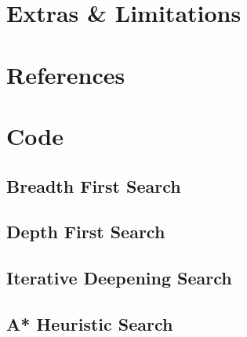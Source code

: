\documentclass[a4paper]{article}
\begin{document}
\section{Extras \& Limitations}

\section{References}


\newpage
\section{Code}
\subsection{Breadth First Search}


\newpage
\subsection{Depth First Search}


\newpage
\subsection{Iterative Deepening Search}


\newpage
\subsection{A* Heuristic Search}

\end{document}
